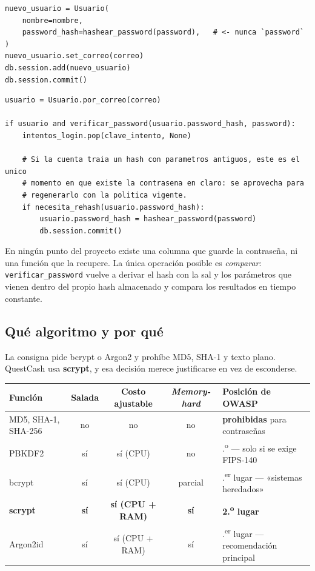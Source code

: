 \documentclass[11pt,letterpaper]{article}
\begin{document}
\begin{lstlisting}[style=py,caption={\texttt{app.py} — alta de usuario por el formulario web.}]
nuevo_usuario = Usuario(
    nombre=nombre,
    password_hash=hashear_password(password),   # <- nunca `password`
)
nuevo_usuario.set_correo(correo)
db.session.add(nuevo_usuario)
db.session.commit()
\end{lstlisting}

\begin{lstlisting}[style=py,caption={\texttt{app.py} — verificación al iniciar sesión, con re-hash oportunista.}]
usuario = Usuario.por_correo(correo)

if usuario and verificar_password(usuario.password_hash, password):
    intentos_login.pop(clave_intento, None)

    # Si la cuenta traia un hash con parametros antiguos, este es el unico
    # momento en que existe la contrasena en claro: se aprovecha para
    # regenerarlo con la politica vigente.
    if necesita_rehash(usuario.password_hash):
        usuario.password_hash = hashear_password(password)
        db.session.commit()
\end{lstlisting}

En ningún punto del proyecto existe una columna que guarde la contraseña, ni
una función que la recupere. La única operación posible es \emph{comparar}:
\texttt{verificar\_password} vuelve a derivar el hash con la sal y los
parámetros que vienen dentro del propio hash almacenado y compara los
resultados en tiempo constante.

\subsection{Qué algoritmo y por qué}
\label{sec:algoritmo}

La consigna pide bcrypt o Argon2 y prohíbe MD5, SHA-1 y texto plano.
QuestCash usa \textbf{scrypt}, y esa decisión merece justificarse en vez de
esconderse.

\begin{center}
\small
\begin{tabular}{@{}l c c c >{\raggedright\arraybackslash}p{4.6cm}@{}}
\toprule
\textbf{Función} & \textbf{Salada} & \textbf{Costo ajustable} & \textbf{\emph{Memory-hard}} & \textbf{Posición de OWASP} \\
\midrule
MD5, SHA-1, SHA-256 & no & no & no & \textcolor{qcRed}{\textbf{prohibidas}} para contraseñas \\
PBKDF2   & sí & sí (CPU) & no  & 4.\textsuperscript{o} — solo si se exige FIPS-140 \\
bcrypt   & sí & sí (CPU) & parcial & 3.\textsuperscript{er} lugar — «sistemas heredados» \\
\textbf{scrypt}   & \textbf{sí} & \textbf{sí (CPU + RAM)} & \textbf{sí} & \textbf{2.\textsuperscript{o} lugar} \\
Argon2id & sí & sí (CPU + RAM) & sí & 1.\textsuperscript{er} lugar — recomendación principal \\
\bottomrule
\end{tabular}
\end{center}
\end{document}
